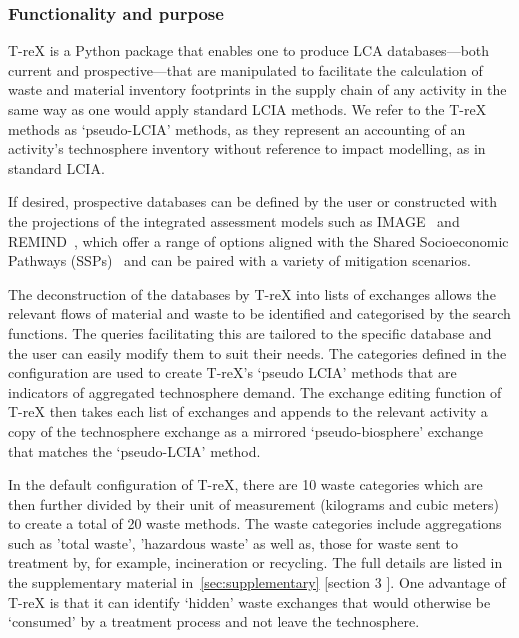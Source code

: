 \documentclass[a4paper,fleqn]{cas-dc}
\begin{document}
\subsubsection{Functionality and purpose}

T-reX is a Python package that enables one to produce LCA databases---both
current and prospective---that are manipulated to facilitate the calculation of
waste and material inventory footprints in the supply chain of any activity in
the same way as one would apply standard LCIA methods. We refer to the T-reX
methods as `pseudo-LCIA' methods, as they represent an accounting of an
activity's technosphere inventory without reference to impact modelling, as in
standard LCIA.

If desired, prospective databases can be defined by the user or constructed
with the projections of the integrated assessment models such as
IMAGE~\citep{stehfest2014image} and REMIND~\citep{remind2020model}, which offer
a range of options aligned with the Shared Socioeconomic Pathways
(SSPs)~\citep{ssp2020ghg} and can be paired with a variety of mitigation
scenarios.

The deconstruction of the databases by T-reX into lists of exchanges allows the
relevant flows of material and waste to be identified and categorised by the
search functions. The queries facilitating this are tailored to the specific
database and the user can easily modify them to suit their needs. The
categories defined in the configuration are used to create T-reX's `pseudo
LCIA' methods that are indicators of aggregated technosphere demand. The
exchange editing function of T-reX then takes each list of exchanges and
appends to the relevant activity a copy of the technosphere exchange as a
mirrored `pseudo-biosphere' exchange that matches the `pseudo-LCIA' method.

In the default configuration of T-reX, there are 10 waste categories which are
then further divided by their unit of measurement (kilograms and cubic meters)
to create a total of 20 waste methods. The waste categories include
aggregations such as 'total waste', 'hazardous waste' as well as, those for
waste sent to treatment by, for example, incineration or recycling. The full
details are listed in the supplementary material in~\autoref{sec:supplementary}
[section 3 ]. One advantage of T-reX is that it can identify `hidden' waste
exchanges that would otherwise be `consumed' by a treatment process and not
leave the technosphere.
\end{document}
